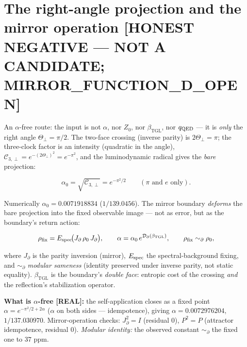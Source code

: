 \documentclass[11pt]{article}
\newcommand{\bTGL}{\beta_{\mathrm{TGL}}}\newcommand{\Msun}{M_{\odot}}\newcommand{\TGL}{\mathrm{TGL}}
\theoremstyle{definition}\newtheorem{deriv}{Derivation}
\begin{document}
\section{The right-angle projection and the mirror operation \textsf{[HONEST NEGATIVE --- NOT A CANDIDATE; MIRROR\_FUNCTION\_D\_OPEN]}}

An $\alpha$-free route: the input is not $\alpha$, nor $Z_0$, nor $\bTGL$, nor $q_{\rm QED}$ --- it is \emph{only} the right angle $\Theta_\perp=\pi/2$. The two-face crossing (inverse parity) is $2\Theta_\perp=\pi$; the three-clock factor is an intensity (quadratic in the angle), $\mathcal C_{3,\perp}=e^{-(2\Theta_\perp)^2}=e^{-\pi^2}$, and the luminodynamic radical gives the \emph{bare} projection:

\begin{equation} \alpha_0=\sqrt{\mathcal C_{3,\perp}}=e^{-\pi^2/2}\qquad(\pi\text{ and }e\text{ only}).\end{equation}

Numerically $\alpha_0=0.0071918834$ ($1/139.0456$). The mirror boundary \emph{deforms} the bare projection into the fixed observable image --- not as error, but as the boundary's return action:

\begin{equation} \rho_{\rm fix}=E_{\rm spec}\!\big(J_\partial\,\rho_0\,J_\partial\big),\qquad \alpha=\alpha_0\,e^{\mathcal D_\partial(\bTGL)},\qquad \rho_{\rm fix}\sim_\partial\rho_0,\end{equation}

where $J_\partial$ is the parity inversion (mirror), $E_{\rm spec}$ the spectral-background fixing, and $\sim_\partial$ \emph{modular sameness} (identity preserved under inverse parity, not static equality). $\bTGL$ is the boundary's \emph{double face}: entropic cost of the crossing \emph{and} the reflection's stabilization operator.

\textbf{What is $\alpha$-free \textsf{[REAL]}:} the self-application closes as a fixed point $\alpha=e^{-\pi^2/2+2\alpha}$ ($\alpha$ on both sides --- idempotence), giving $\alpha=0.0072976204$, $1/137.030970$. Mirror-operation checks: $J_\partial^2=I$ (residual $0$), $P^2=P$ (attractor idempotence, residual $0$). \emph{Modular identity:} the observed constant $\sim_\partial$ the fixed one to $37$ ppm.
\end{document}
